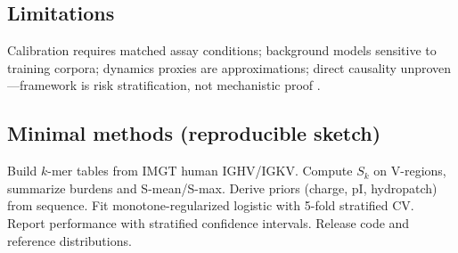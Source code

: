 \subsection*{Limitations}
Calibration requires matched assay conditions; background models sensitive to training corpora; dynamics proxies are approximations; direct causality unproven—framework is risk stratification, not mechanistic proof \cite{Cunningham2021,Herling2023}.

\subsection*{Minimal methods (reproducible sketch)}
Build $k$-mer tables from IMGT human IGHV/IGKV. Compute $S_k$ on V-regions, summarize burdens and S-mean/S-max. Derive priors (charge, pI, hydropatch) from sequence. Fit monotone-regularized logistic with 5-fold stratified CV. Report performance with stratified confidence intervals. Release code and reference distributions.

